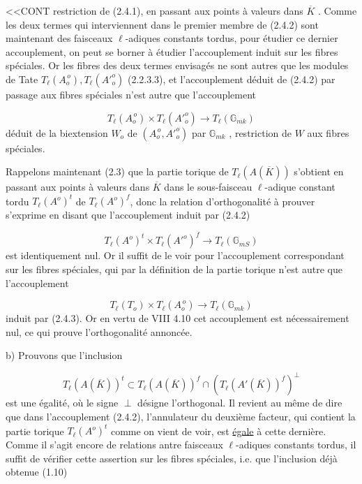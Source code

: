 
<<CONT restriction de (2.4.1), en passant aux points à valeurs dans $\overline{K}$ . Comme les deux termes qui interviennent dans le premier membre de (2.4.2) sont maintenant des faisceaux $\ell$-adiques constants tordus, pour étudier ce dernier accouplement, on peut se borner à étudier l'accouplement induit sur les fibres spéciales. Or les fibres des deux termes envisagés ne sont autres que les modules de Tate $T_{\ell}(A_{o}^{\,o}),T_{\ell}({A'}^{o}_{o})$ (2.2.3.3), et l'accouplement déduit de (2.4.2) par passage aux fibres spéciales n'est autre que l'accouplement

\begin{equation}\tag{2.4.3}
T_{\ell}(A_{o}^{\,o}) \times T_{\ell}({A'}^{o}_{o}) \longrightarrow T_{\ell}(\mathbb{G}_{mk})
\end{equation}
déduit de la biextension $W_{o}$ de $(A_{o}^{\,o},{A'}^{o}_{o})$ par $\mathbb{G}_{mk}$ , restriction de $W$ aux fibres spéciales.

Rappelons maintenant (2.3) que la partie torique de $T_{\ell}(A(\overline{K}))$ s'obtient en passant aux points à valeurs dans $\overline{K}$ dans le sous-faisceau $\ell$-adique constant tordu $T_{\ell}(A^{o})^{t}$ de $T_{\ell}(A^{o})^{f}$, donc la relation d'orthogonalité à prouver s'exprime en disant que l'accouplement induit par (2.4.2)

\begin{equation}\tag{2.4.4}
T_{\ell}(A^{o})^{t} \times T_{\ell}({A'}^{o})^{f} \longrightarrow T_{\ell}(\mathbb{G}_{mS})
\end{equation}
est identiquement nul. Or il suffit de le voir pour l'accouplement correspondant sur les fibres spéciales, qui par la définition de la partie torique n'est autre que l'accouplement

\begin{equation}\tag{2.4.5}
T_{\ell}(T_{o}) \times T_{\ell}(A_{o}^{\,o}) \longrightarrow T_{\ell}(\mathbb{G}_{mk})
\end{equation}
induit par (2.4.3). Or en vertu de VIII 4.10 cet accouplement est nécessairement nul, ce qui prouve l'orthogonalité annoncée.



b)  Prouvons que l'inclusion

\begin{equation}\tag{2.4.6}
T_{\ell}(A(\overline{K}))^{t} \subset T_{\ell}(A(\overline{K}))^{f} \cap (T_{\ell}(A'(\overline{K}))^{f})^{\perp}
\end{equation}
est une égalité, où le signe $\perp$ désigne l'orthogonal. Il revient au même de dire que dans l'accouplement (2.4.2), l'annulateur du deuxième facteur, qui contient la partie torique $T_{\ell}(A^{o})^{t}$ comme on vient de voir, est \underline{égale} à cette dernière. Comme il s'agit encore de relations antre faisceaux $\ell$-adiques constants tordus, il suffit de vérifier cette assertion sur les fibres spéciales, i.e. que l'inclusion déjà obtenue (1.10)


